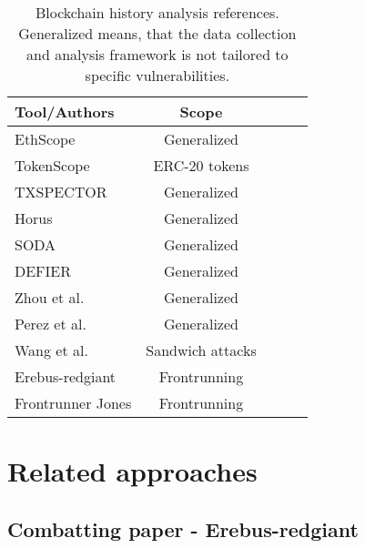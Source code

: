 \documentclass[draft,final]{vutinfth} %
\begin{document}
    \begin{table}[h]
        \begin{center}
            \begin{tabular}{ | l | c  | c | c | c | }
                \hline
                Tool/Authors                                     & Scope            \\ \hline
                EthScope \cite{wu_time-travel_2022}              & Generalized      \\ \hline
                TokenScope \cite{chen_tokenscope_2019}           & ERC-20 tokens    \\ \hline
                TXSPECTOR \cite{zhang_txspector_2020}            & Generalized      \\ \hline
                Horus \cite{ferreira_torres_eye_2021}            & Generalized      \\ \hline
                SODA \cite{chen_soda_2020}                       & Generalized      \\ \hline
                DEFIER \cite{su_evil_2021}                       & Generalized      \\ \hline
                Zhou et al. \cite{zhou_ever-evolving_2020}       & Generalized      \\ \hline
                Perez et al. \cite{perez_smart_2021}             & Generalized      \\ \hline
                Wang et al. \cite{wang_impact_2022}              & Sandwich attacks \\ \hline
                Erebus-redgiant \cite{zhang_combatting_2023}     & Frontrunning     \\ \hline
                Frontrunner Jones \cite{torres_frontrunner_2021} & Frontrunning     \\ \hline
            \end{tabular}
            \caption{Blockchain history analysis references. Generalized means, that the data collection and analysis framework is not tailored to specific vulnerabilities.}
            \label{tab:blockchain_history_analyzers}
        \end{center}
    \end{table}

    \section{Related approaches}

    \subsection{Combatting paper - Erebus-redgiant}
\end{document}
